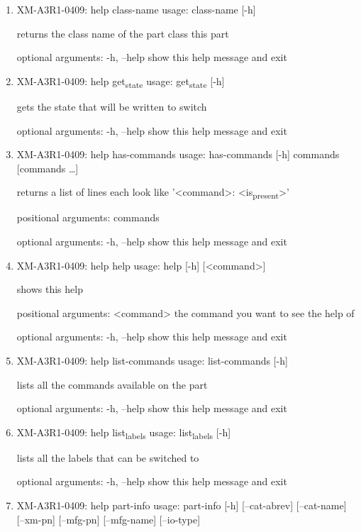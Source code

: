 \documentclass[11pt]{article}
\begin{document}
\begin{enumerate}
\item XM-A3R1-0409: help class-name
\label{sec:org2720c5a}
usage: class-name [-h]

returns the class name of the part class this part

optional arguments:
  -h, --help  show this help message and exit

\item XM-A3R1-0409: help get\textsubscript{state}
\label{sec:orgec3dde9}
usage: get\textsubscript{state} [-h]

gets the state that will be written to switch

optional arguments:
  -h, --help  show this help message and exit

\item XM-A3R1-0409: help has-commands
\label{sec:org996dcce}
usage: has-commands [-h] commands [commands \ldots{}]

returns a list of lines each look like '<command>: <is\textsubscript{present}>'

positional arguments:
  commands

optional arguments:
  -h, --help  show this help message and exit

\item XM-A3R1-0409: help help
\label{sec:orgdfe9dae}
usage: help [-h] [<command>]

shows this help

positional arguments:
  <command>   the command you want to see the help of

optional arguments:
  -h, --help  show this help message and exit

\item XM-A3R1-0409: help list-commands
\label{sec:org3895043}
usage: list-commands [-h]

lists all the commands available on the part

optional arguments:
  -h, --help  show this help message and exit

\item XM-A3R1-0409: help list\textsubscript{labels}
\label{sec:orgefe7b94}
usage: list\textsubscript{labels} [-h]

lists all the labels that can be switched to

optional arguments:
  -h, --help  show this help message and exit

\item XM-A3R1-0409: help part-info
\label{sec:org197b5d6}
usage: part-info  [-h] [--cat-abrev] [--cat-name] [--xm-pn] [--mfg-pn] [--mfg-name]
        [--io-type]


\end{enumerate}
\end{document}
